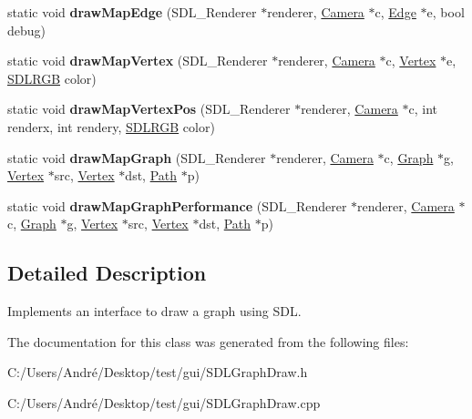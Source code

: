 \begin{DoxyCompactItemize}
\item 
\hypertarget{class_s_d_l_graph_draw_a825f75426a2b290bc511215e1a25dc2c}{}static void {\bfseries draw\+Map\+Edge} (S\+D\+L\+\_\+\+Renderer $\ast$renderer, \hyperlink{class_camera}{Camera} $\ast$c, \hyperlink{class_edge}{Edge} $\ast$e, bool debug)\label{class_s_d_l_graph_draw_a825f75426a2b290bc511215e1a25dc2c}

\item 
\hypertarget{class_s_d_l_graph_draw_a6cf3b33aa5828e7ef9f60925f9f915e9}{}static void {\bfseries draw\+Map\+Vertex} (S\+D\+L\+\_\+\+Renderer $\ast$renderer, \hyperlink{class_camera}{Camera} $\ast$c, \hyperlink{class_vertex}{Vertex} $\ast$e, \hyperlink{class_s_d_l_r_g_b}{S\+D\+L\+R\+G\+B} color)\label{class_s_d_l_graph_draw_a6cf3b33aa5828e7ef9f60925f9f915e9}

\item 
\hypertarget{class_s_d_l_graph_draw_aa15194fdd2703387939b859d6e6e30aa}{}static void {\bfseries draw\+Map\+Vertex\+Pos} (S\+D\+L\+\_\+\+Renderer $\ast$renderer, \hyperlink{class_camera}{Camera} $\ast$c, int renderx, int rendery, \hyperlink{class_s_d_l_r_g_b}{S\+D\+L\+R\+G\+B} color)\label{class_s_d_l_graph_draw_aa15194fdd2703387939b859d6e6e30aa}

\item 
\hypertarget{class_s_d_l_graph_draw_a6cf48dea85e7383cf40c532bc7bdeae1}{}static void {\bfseries draw\+Map\+Graph} (S\+D\+L\+\_\+\+Renderer $\ast$renderer, \hyperlink{class_camera}{Camera} $\ast$c, \hyperlink{class_graph}{Graph} $\ast$g, \hyperlink{class_vertex}{Vertex} $\ast$src, \hyperlink{class_vertex}{Vertex} $\ast$dst, \hyperlink{class_path}{Path} $\ast$p)\label{class_s_d_l_graph_draw_a6cf48dea85e7383cf40c532bc7bdeae1}

\item 
\hypertarget{class_s_d_l_graph_draw_ad220735800321912cb928b92d3cee3fb}{}static void {\bfseries draw\+Map\+Graph\+Performance} (S\+D\+L\+\_\+\+Renderer $\ast$renderer, \hyperlink{class_camera}{Camera} $\ast$c, \hyperlink{class_graph}{Graph} $\ast$g, \hyperlink{class_vertex}{Vertex} $\ast$src, \hyperlink{class_vertex}{Vertex} $\ast$dst, \hyperlink{class_path}{Path} $\ast$p)\label{class_s_d_l_graph_draw_ad220735800321912cb928b92d3cee3fb}

\end{DoxyCompactItemize}


\subsection{Detailed Description}
Implements an interface to draw a graph using S\+D\+L. 

The documentation for this class was generated from the following files\+:\begin{DoxyCompactItemize}
\item 
C\+:/\+Users/\+André/\+Desktop/test/gui/S\+D\+L\+Graph\+Draw.\+h\item 
C\+:/\+Users/\+André/\+Desktop/test/gui/S\+D\+L\+Graph\+Draw.\+cpp\end{DoxyCompactItemize}
